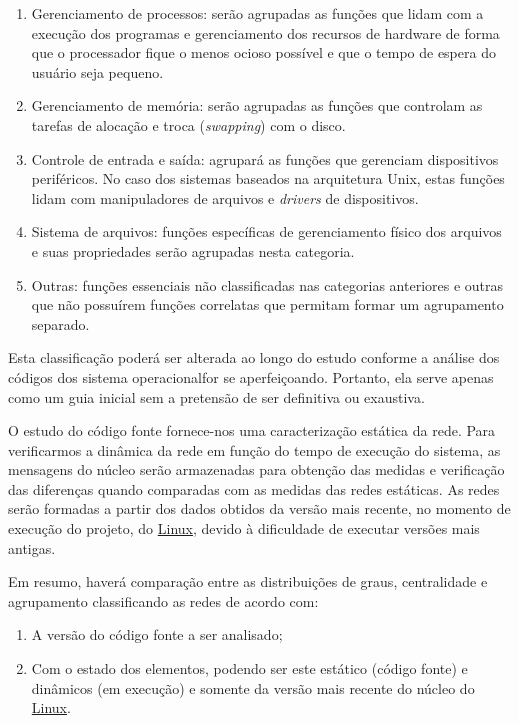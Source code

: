 \documentclass[a4paper,12pt,twoside]{article}
\def\linux{\href{http://www.kernel.org/}{\sc Linux}}
\begin{document}
\begin{enumerate}
\item Gerenciamento de processos: serão agrupadas as funções que lidam
  com a execução dos programas e gerenciamento dos recursos de
  hardware de forma que o processador fique o menos ocioso possível e
  que o tempo de espera do usuário seja pequeno.

\item Gerenciamento de memória: serão agrupadas as funções que
  controlam as tarefas de alocação e troca ({\em swapping}) com o
  disco.
  
\item Controle de entrada e saída: agrupará as funções que gerenciam
  dispositivos periféricos. No caso dos sistemas baseados na
  arquitetura Unix, estas funções lidam com manipuladores de arquivos
  e {\em drivers} de dispositivos.
  
\item Sistema de arquivos: funções específicas de gerenciamento físico
  dos arquivos e suas propriedades serão agrupadas nesta categoria.

\item Outras: funções essenciais não classificadas nas categorias
  anteriores e outras que não possuírem funções correlatas que
  permitam formar um agrupamento separado.
\end{enumerate}

Esta classificação poderá ser alterada ao longo do estudo conforme a
análise dos códigos dos sistema operacionalfor se
aperfeiçoando. Portanto, ela serve apenas como um guia inicial sem a
pretensão de ser definitiva ou exaustiva.

O estudo do código fonte fornece-nos uma caracterização estática da
rede. Para verificarmos a dinâmica da rede em função do tempo de
execução do sistema, as mensagens do núcleo serão armazenadas para
obtenção das medidas e verificação das diferenças quando comparadas
com as medidas das redes estáticas. As redes serão formadas a partir
dos dados obtidos da versão mais recente, no momento de execução do
projeto, do \linux{}, devido à dificuldade de executar versões mais
antigas.

Em resumo, haverá comparação entre as distribuições de graus,
centralidade e agrupamento classificando as redes de acordo com:

\begin{enumerate}
\item A versão do código fonte a ser analisado;
\item Com o estado dos elementos, podendo ser este estático (código
  fonte) e dinâmicos (em execução) e somente da versão mais recente do
  núcleo do \linux.

\end{enumerate}
\end{document}
